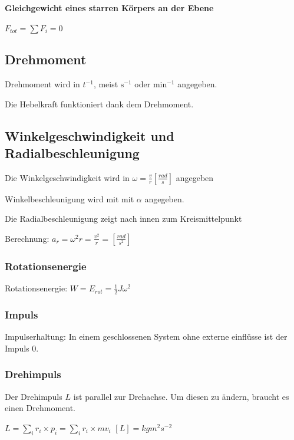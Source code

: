\documentclass[a4paper]{scrartcl}
\begin{document}
	
	
	\paragraph{Gleichgewicht eines starren Körpers an der Ebene}
	$F_{tot} = \sum{F_i} = 0$


\subsection{Drehmoment}
	Drehmoment wird in $t^{-1}$, meist $\text{s}^{-1}$ oder $\text{min}^{-1}$ angegeben.
	
	Die Hebelkraft funktioniert dank dem Drehmoment.

\subsection{Winkelgeschwindigkeit und Radialbeschleunigung}
	Die Winkelgeschwindigkeit wird in $\omega = \frac{v}{r}\left[ \frac{rad}{s} \right]$ angegeben
	
	Winkelbeschleunigung wird mit mit $\alpha$ angegeben.
	
	Die Radialbeschleunigung zeigt nach innen zum Kreismittelpunkt
	
	Berechnung: $a_r = \omega^2 r = \frac{v^2}{r} = \left[ \frac{rad}{s^2} \right]$

\subsubsection{Rotationsenergie}

	Rotationsenergie: $W = E_{rot} = \frac{1}{2} J \omega^2$
	
\subsubsection{Impuls}

Impulserhaltung: In einem geschlossenen System ohne externe einflüsse ist der Impuls 0. 
	
\subsubsection{Drehimpuls} %
	Der Drehimpuls $L$ ist parallel zur Drehachse. Um diesen zu ändern, braucht es einen Drehmoment.

	$L = \sum_i{r_i \times p_i} = \sum_i{r_i \times mv_i}$
	$\left[ L \right] = kg m^2 s^{-2}$
	
\end{document}
